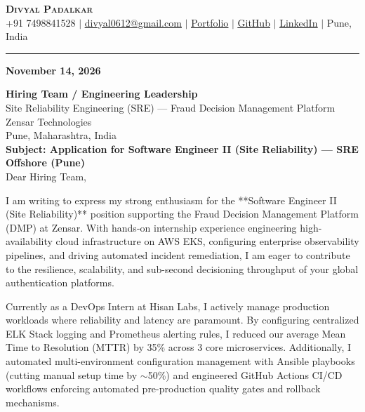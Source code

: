 \documentclass[letterpaper,11pt]{article}
\begin{document}
\begin{center}
    \textbf{\Huge \scshape Divyal Padalkar} \\ \vspace{3pt}
    \small +91 7498841528 $|$ \href{mailto:divyal0612@gmail.com}{\underline{divyal0612@gmail.com}} $|$ 
    \href{https://devops-sre-portfolio.vercel.app}{\underline{Portfolio}} $|$
    \href{https://github.com/divyal27}{\underline{GitHub}} $|$
    \href{https://www.linkedin.com/in/divyal-padalkar2704/}{\underline{LinkedIn}} $|$
    \small Pune, India
\end{center}

\vspace{-4pt}
\hrule
\vspace{14pt}

\noindent \textbf{November 14, 2026} \\ \vspace{8pt}

\noindent \textbf{Hiring Team / Engineering Leadership} \\
Site Reliability Engineering (SRE) — Fraud Decision Management Platform \\
Zensar Technologies \\
Pune, Maharashtra, India \\

\vspace{10pt}
\noindent \textbf{Subject: Application for Software Engineer II (Site Reliability) — SRE Offshore (Pune)} \\

\vspace{8pt}
\noindent Dear Hiring Team,

\vspace{6pt}
I am writing to express my strong enthusiasm for the **Software Engineer II (Site Reliability)** position supporting the Fraud Decision Management Platform (DMP) at Zensar. With hands-on internship experience engineering high-availability cloud infrastructure on AWS EKS, configuring enterprise observability pipelines, and driving automated incident remediation, I am eager to contribute to the resilience, scalability, and sub-second decisioning throughput of your global authentication platforms.

Currently as a DevOps Intern at Hisan Labs, I actively manage production workloads where reliability and latency are paramount. By configuring centralized ELK Stack logging and Prometheus alerting rules, I reduced our average Mean Time to Resolution (MTTR) by 35\% across 3 core microservices. Additionally, I automated multi-environment configuration management with Ansible playbooks (cutting manual setup time by $\sim$50\%) and engineered GitHub Actions CI/CD workflows enforcing automated pre-production quality gates and rollback mechanisms.
\end{document}
